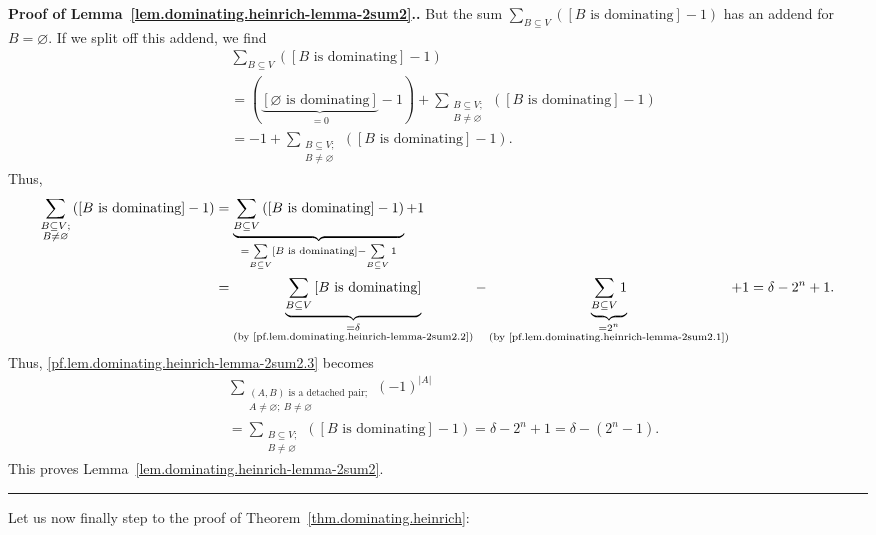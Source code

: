 \documentclass[numbers=enddot,12pt,final,onecolumn,notitlepage]{scrartcl}%
\theoremstyle{definition}
\newenvironment{proof}[1][Proof]{\noindent\textbf{#1.} }{\ \rule{0.5em}{0.5em}}
\let\sumnonlimits\sum
\renewcommand{\sum}{\sumnonlimits\limits}
\newcommand{\abs}[1]{\left| #1 \right|}
\newcommand{\tup}[1]{\left( #1 \right)}
\newcommand{\ive}[1]{\left[ #1 \right]}
\begin{document}
\begin{proof}[Proof of
Lemma~\ref{lem.dominating.heinrich-lemma-2sum2}.]
But the sum
$\sum_{B \subseteq V} \tup{\ive{B \text{ is dominating}} - 1}$ has an
addend for $B = \varnothing$. If we split off this addend, we find
\begin{align*}
& \sum_{B \subseteq V} \tup{\ive{B \text{ is dominating}} - 1} \\
& = \tup{\underbrace{\ive{\varnothing \text{ is dominating}}}_{=0} - 1}
+ \sum_{\substack{B \subseteq V; \\ B \neq \varnothing}}
\tup{\ive{B \text{ is dominating}} - 1} \\
&= -1
+ \sum_{\substack{B \subseteq V; \\ B \neq \varnothing}}
\tup{\ive{B \text{ is dominating}} - 1} .
\end{align*}
Thus,
\begin{align*}
\sum_{\substack{B \subseteq V; \\ B \neq \varnothing}}
\tup{\ive{B \text{ is dominating}} - 1}
&= \underbrace{
\sum_{B \subseteq V} \tup{\ive{B \text{ is dominating}} - 1}
}_{= \sum_{B \subseteq V} \ive{B \text{ is dominating}}
- \sum_{B \subseteq V} 1}
+ 1 \\
&= \underbrace{\sum_{B \subseteq V} \ive{B \text{ is dominating}}}_{
        \substack{= \delta \\
       \text{(by \eqref{pf.lem.dominating.heinrich-lemma-2sum2.2})}}}
- \underbrace{\sum_{B \subseteq V} 1}_{\substack{= 2^n \\
       \text{(by \eqref{pf.lem.dominating.heinrich-lemma-2sum2.1})}}}
+ 1
= \delta - 2^n + 1.
\end{align*}
Thus, \eqref{pf.lem.dominating.heinrich-lemma-2sum2.3} becomes
\begin{align*}
& \sum_{\substack{\tup{A, B} \text{ is a detached pair}; \\
                A \neq \varnothing; \  B \neq \varnothing}}
  \tup{-1}^{\abs{A}} \\
&= \sum_{\substack{B \subseteq V; \\ B \neq \varnothing}}
\tup{\ive{B \text{ is dominating}} - 1} = \delta - 2^n + 1
= \delta - \tup{2^n - 1} .
\end{align*}
This proves Lemma~\ref{lem.dominating.heinrich-lemma-2sum2}.
\end{proof}

Let us now finally step to the proof of
Theorem~\ref{thm.dominating.heinrich}:
\end{document}
